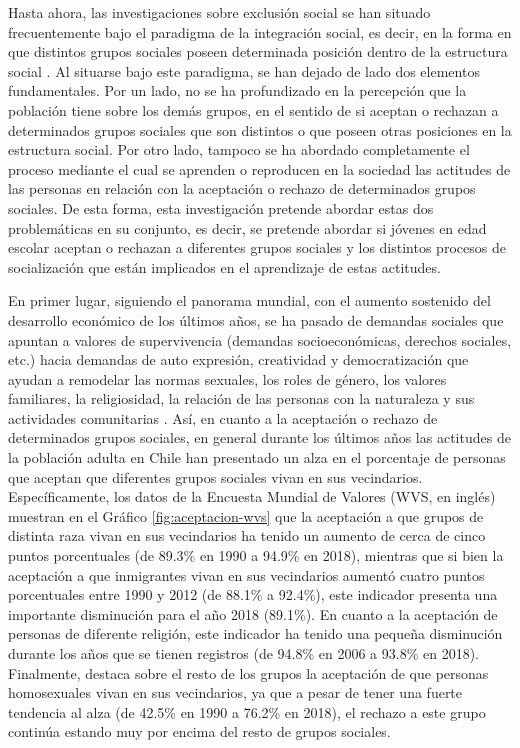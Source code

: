 \documentclass[12pt,twoside]{templates/facsothesis}
\begin{document}
Hasta ahora, las investigaciones sobre exclusión social se han situado frecuentemente bajo el paradigma de la integración social, es decir, en la forma en que distintos grupos sociales poseen determinada posición dentro de la estructura social \citep[ej.][]{young_justicia_2000, wade_raza_2000, viverosvigoya_interseccionalidad_2016}. Al situarse bajo este paradigma, se han dejado de lado dos elementos fundamentales. Por un lado, no se ha profundizado en la percepción que la población tiene sobre los demás grupos, en el sentido de si aceptan o rechazan a determinados grupos sociales que son distintos o que poseen otras posiciones en la estructura social. Por otro lado, tampoco se ha abordado completamente el proceso mediante el cual se aprenden o reproducen en la sociedad las actitudes de las personas en relación con la aceptación o rechazo de determinados grupos sociales. De esta forma, esta investigación pretende abordar estas dos problemáticas en su conjunto, es decir, se pretende abordar si jóvenes en edad escolar aceptan o rechazan a diferentes grupos sociales y los distintos procesos de socialización que están implicados en el aprendizaje de estas actitudes.

En primer lugar, siguiendo el panorama mundial, con el aumento sostenido del desarrollo económico de los últimos años, se ha pasado de demandas sociales que apuntan a valores de supervivencia (demandas socioeconómicas, derechos sociales, etc.) hacia demandas de auto expresión, creatividad y democratización que ayudan a remodelar las normas sexuales, los roles de género, los valores familiares, la religiosidad, la relación de las personas con la naturaleza y sus actividades comunitarias \citep{inglehart_Modernization_2001}. Así, en cuanto a la aceptación o rechazo de determinados grupos sociales, en general durante los últimos años las actitudes de la población adulta en Chile han presentado un alza en el porcentaje de personas que aceptan que diferentes grupos sociales vivan en sus vecindarios. Específicamente, los datos de la Encuesta Mundial de Valores (WVS, en inglés) muestran en el Gráfico \ref{fig:aceptacion-wvs} que la aceptación a que grupos de distinta raza vivan en sus vecindarios ha tenido un aumento de cerca de cinco puntos porcentuales (de 89.3\% en 1990 a 94.9\% en 2018), mientras que si bien la aceptación a que inmigrantes vivan en sus vecindarios aumentó cuatro puntos porcentuales entre 1990 y 2012 (de 88.1\% a 92.4\%), este indicador presenta una importante disminución para el año 2018 (89.1\%). En cuanto a la aceptación de personas de diferente religión, este indicador ha tenido una pequeña disminución durante los años que se tienen registros (de 94.8\% en 2006 a 93.8\% en 2018). Finalmente, destaca sobre el resto de los grupos la aceptación de que personas homosexuales vivan en sus vecindarios, ya que a pesar de tener una fuerte tendencia al alza (de 42.5\% en 1990 a 76.2\% en 2018), el rechazo a este grupo continúa estando muy por encima del resto de grupos sociales.
\end{document}
